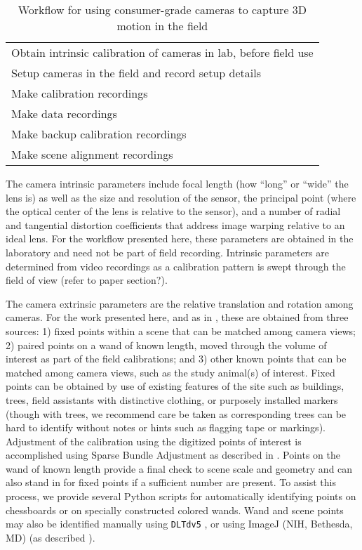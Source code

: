 \documentclass[fleqn,10pt]{wlpeerj}
\begin{document}
\begin{table}
\caption{Workflow for using consumer-grade cameras to capture 3D motion in the field}
\label{tbl:workflowsummary}
\begin{tabular}{l}
Obtain intrinsic calibration of cameras in lab, before field use\\
Setup cameras in the field and record setup details\\
Make calibration recordings\\
Make data recordings\\
Make backup calibration recordings\\
Make scene alignment recordings\\
\end{tabular}
\end{table}

The camera intrinsic parameters include focal length (how ``long'' or ``wide'' the lens is) as well as the size and resolution of the sensor, the principal point (where the optical center of the lens is relative to the sensor), and a number of radial and tangential distortion coefficients that address image warping relative to an ideal lens. For the workflow presented here, these parameters are obtained in the laboratory and need not be part of field recording.  Intrinsic parameters are determined from video recordings as a calibration pattern is swept through the field of view (refer to paper section?).  

The camera extrinsic parameters are the relative translation and rotation among cameras.  For the work presented here, and as in \citep{Theriault:2014}, these are obtained from three sources: 1) fixed points within a scene that can be matched among camera views; 2) paired points on a wand of known length, moved through the volume of interest as part of the field calibrations; and 3) other known points that can be matched among camera views, such as the study animal(s) of interest. Fixed points can be obtained by use of existing features of the site such as buildings, trees, field assistants with distinctive clothing, or purposely installed markers (though with trees, we recommend care be taken as corresponding trees can be hard to identify without notes or hints such as flagging tape or markings).  Adjustment of the calibration using the digitized points of interest is accomplished using Sparse Bundle Adjustment as described in \citep{lour09, Theriault:2014}.  Points on the wand of known length provide a final check to scene scale and geometry and can also stand in for fixed points if a sufficient number are present. To assist this process, we provide several Python scripts for automatically identifying points on chessboards or on specially constructed colored wands. Wand and scene points may also be identified manually using \texttt{DLTdv5} \citep{Hedrick2008}, or using ImageJ (NIH, Bethesda, MD) (as described \citealp{Kane2012}). %
\end{document}
